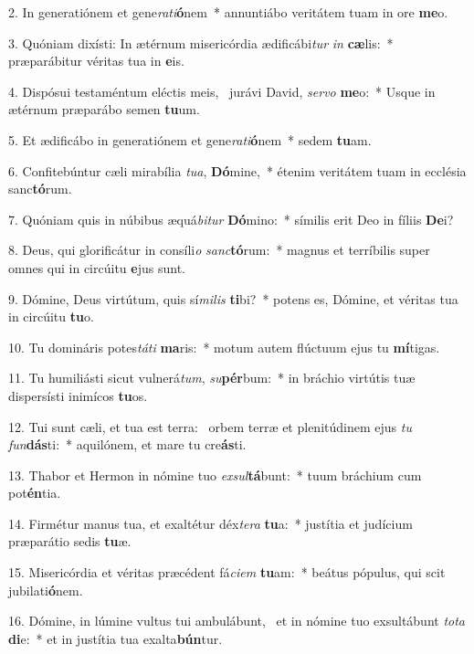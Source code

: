 2. In generatiónem et gene\textit{ra}\textit{ti}\textbf{ó}nem~*  annuntiábo veritátem tuam in ore \textbf{me}o.\

3. Quóniam dixísti: In ætérnum misericórdia ædificábi\textit{tur} \textit{in} \textbf{cæ}lis:~*  præparábitur véritas tua in \textbf{e}is.\

4. Dispósui testaméntum eléctis meis, \dag\  jurávi David, \textit{ser}\textit{vo} \textbf{me}o:~*  Usque in ætérnum præparábo semen \textbf{tu}um.\

5. Et ædificábo in generatiónem et gene\textit{ra}\textit{ti}\textbf{ó}nem~*  sedem \textbf{tu}am.\

6. Confitebúntur cæli mirabília \textit{tu}\textit{a}, \textbf{Dó}mine,~*  étenim veritátem tuam in ecclésia sanc\textbf{tó}rum.\

7. Quóniam quis in núbibus æquá\textit{bi}\textit{tur} \textbf{Dó}mino:~*  símilis erit Deo in fíliis \textbf{De}i?\

8. Deus, qui glorificátur in consíli\textit{o} \textit{sanc}\textbf{tó}rum:~*  magnus et terríbilis super omnes qui in circúitu \textbf{e}jus sunt.\

9. Dómine, Deus virtútum, quis sí\textit{mi}\textit{lis} \textbf{ti}bi?~*  potens es, Dómine, et véritas tua in circúitu \textbf{tu}o.\

10. Tu domináris potes\textit{tá}\textit{ti} \textbf{ma}ris:~*  motum autem flúctuum ejus tu \textbf{mí}tigas.\

11. Tu humiliásti sicut vulnerá\textit{tum}, \textit{su}\textbf{pér}bum:~*  in bráchio virtútis tuæ dispersísti inimícos \textbf{tu}os.\

12. Tui sunt cæli, et tua est terra: \dag\  orbem terræ et plenitúdinem ejus \textit{tu} \textit{fun}\textbf{dás}ti:~*  aquilónem, et mare tu cre\textbf{ás}ti.\

13. Thabor et Hermon in nómine tuo \textit{ex}\textit{sul}\textbf{tá}bunt:~*  tuum bráchium cum pot\textbf{én}tia.\

14. Firmétur manus tua, et exaltétur déx\textit{te}\textit{ra} \textbf{tu}a:~*  justítia et judícium præparátio sedis \textbf{tu}æ.\

15. Misericórdia et véritas præcédent fá\textit{ci}\textit{em} \textbf{tu}am:~*  beátus pópulus, qui scit jubilati\textbf{ó}nem.\

16. Dómine, in lúmine vultus tui ambulábunt, \dag\  et in nómine tuo exsultábunt \textit{to}\textit{ta} \textbf{di}e:~*  et in justítia tua exalta\textbf{bún}tur.\

